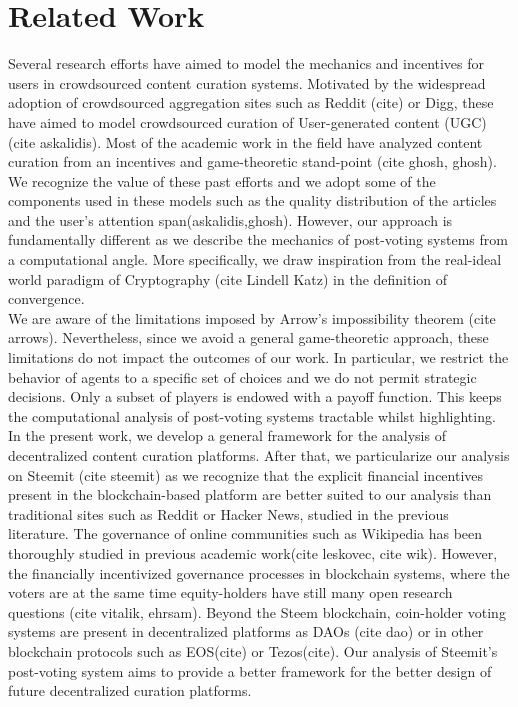 \section{Related Work}
  Several research efforts have aimed to model the mechanics and incentives for users in crowdsourced content curation systems. Motivated by the widespread adoption of crowdsourced aggregation sites such as Reddit (cite) or Digg, these have aimed to model crowdsourced curation of User-generated content (UGC) (cite askalidis). Most of the academic work in the field have analyzed content curation from an incentives and game-theoretic stand-point (cite ghosh, ghosh). We recognize the value of these past efforts and we adopt some of the components used in these models such as the quality distribution of the articles and the user's attention span(askalidis,ghosh). However, our approach is fundamentally different as we describe the mechanics of post-voting systems from a computational angle. More specifically, we draw inspiration from the real-ideal world paradigm of Cryptography (cite Lindell Katz) in the definition of convergence.\\
  
  We are aware of the limitations imposed by Arrow's impossibility theorem (cite arrows). Nevertheless, since we avoid a general game-theoretic approach, these limitations do not impact the outcomes of our work. In particular, we restrict the behavior of agents to a specific set of choices and we do not permit strategic decisions. Only a subset of players is endowed with a payoff function. This keeps the computational analysis of post-voting systems tractable whilst highlighting.\\

  
  In the present work, we develop a general framework for the analysis of decentralized content curation platforms. After that, we particularize our analysis on Steemit (cite steemit) as we recognize that the explicit financial incentives present in the blockchain-based platform are better suited to our analysis than traditional sites such as Reddit or Hacker News, studied in the previous literature. The governance of online communities such as Wikipedia has been thoroughly studied in previous academic work(cite leskovec, cite wik). However, the financially incentivized governance processes in blockchain systems, where the voters are at the same time equity-holders have still many open research questions (cite vitalik, ehrsam). Beyond the Steem blockchain, coin-holder voting systems are present in decentralized platforms as DAOs (cite dao) or in other blockchain protocols such as EOS(cite) or Tezos(cite). Our analysis of Steemit's post-voting system aims to provide a better framework for the better design of future decentralized curation platforms.
  
  
